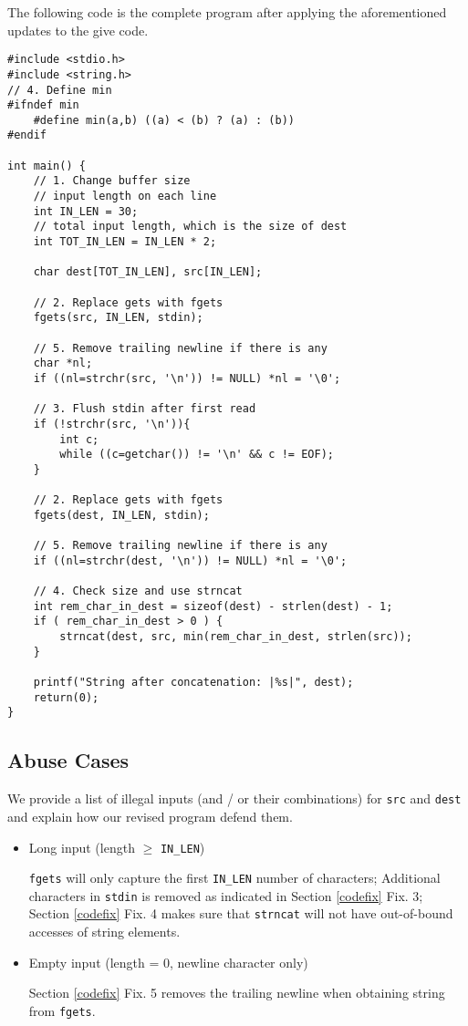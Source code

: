 \documentclass[11pt]{article}
\begin{document}
The following code is the complete program after applying the aforementioned updates to the give code. 
\begin{lstlisting}[style=CStyle]
#include <stdio.h>
#include <string.h>
// 4. Define min
#ifndef min
    #define min(a,b) ((a) < (b) ? (a) : (b))
#endif

int main() {
    // 1. Change buffer size
    // input length on each line
    int IN_LEN = 30;
    // total input length, which is the size of dest
    int TOT_IN_LEN = IN_LEN * 2;
    
    char dest[TOT_IN_LEN], src[IN_LEN];
    
    // 2. Replace gets with fgets
    fgets(src, IN_LEN, stdin);
    
    // 5. Remove trailing newline if there is any
    char *nl;
    if ((nl=strchr(src, '\n')) != NULL) *nl = '\0';

    // 3. Flush stdin after first read
    if (!strchr(src, '\n')){
        int c;
        while ((c=getchar()) != '\n' && c != EOF);
    }
    
    // 2. Replace gets with fgets
    fgets(dest, IN_LEN, stdin);
    
    // 5. Remove trailing newline if there is any
    if ((nl=strchr(dest, '\n')) != NULL) *nl = '\0';

    // 4. Check size and use strncat
    int rem_char_in_dest = sizeof(dest) - strlen(dest) - 1;
    if ( rem_char_in_dest > 0 ) {
        strncat(dest, src, min(rem_char_in_dest, strlen(src));
    }
    
    printf("String after concatenation: |%s|", dest);
    return(0);
}
\end{lstlisting}

\subsection{Abuse Cases}
We provide a list of illegal inputs (and / or their combinations) for \lstinline{src} and \lstinline{dest} and explain how our revised program defend them.
\begin{itemize}
    \item Long input (length $\geq$ \lstinline{IN_LEN}) \par
    \lstinline{fgets} will only capture the first \lstinline{IN_LEN} number of characters; Additional characters in \lstinline{stdin} is removed as indicated in Section \ref{codefix} Fix. 3; Section \ref{codefix} Fix. 4 makes sure that \lstinline{strncat} will not have out-of-bound accesses of string elements. 
    
    \item Empty input (length = 0, newline character only) \par
    Section \ref{codefix} Fix. 5 removes the trailing newline when obtaining string from \lstinline{fgets}.
\end{itemize}
\end{document}
